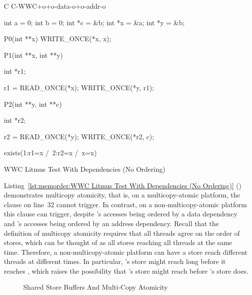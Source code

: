 \begin{listing}[tbp]
{ \scriptsize
\begin{verbbox}[\LstLineNo]
C C-WWC+o+o-data-o+o-addr-o

{
int a = 0;
int b = 0;
int *c = &b;
int *x = &a;
int *y = &b;
}

P0(int **x)
{
  WRITE_ONCE(*x, x);
}

P1(int **x, int **y)
{
  int *r1;

  r1 = READ_ONCE(*x);
  WRITE_ONCE(*y, r1);
}

P2(int **y, int **c)
{
  int *r2;

  r2 = READ_ONCE(*y);
  WRITE_ONCE(*r2, c);
}

exists(1:r1=x /\ 2:r2=x /\ x=x)
\end{verbbox}
}
\centering
\theverbbox
\caption{WWC Litmus Test With Dependencies (No Ordering)}
\label{lst:memorder:WWC Litmus Test With Dependencies (No Ordering)}
\end{listing}

Listing~\ref{lst:memorder:WWC Litmus Test With Dependencies (No Ordering)}
()
demonstrates multicopy atomicity, that is, on a multicopy-atomic platform,
the  clause on line~32 cannot trigger.
In contrast, on a non-multicopy-atomic
platform this  clause can trigger, despite
's accesses being ordered by a data dependency and 's
accesses being ordered by an address dependency.
Recall that the definition of multicopy atomicity requires that all
threads agree on the order of stores, which can be thought of as
all stores reaching all threads at the same time.
Therefore, a non-multicopy-atomic platform can have a store reach
different threads at different times.
In particular, 's store might reach  long before it
reaches , which raises the possibility that 's store
might reach  before 's store does.

\begin{figure}[tb]
\centering
{}
\caption{Shared Store Buffers And Multi-Copy Atomicity}
\label{fig:memorder:Shared Store Buffers And Multi-Copy Atomicity}
\end{figure}

